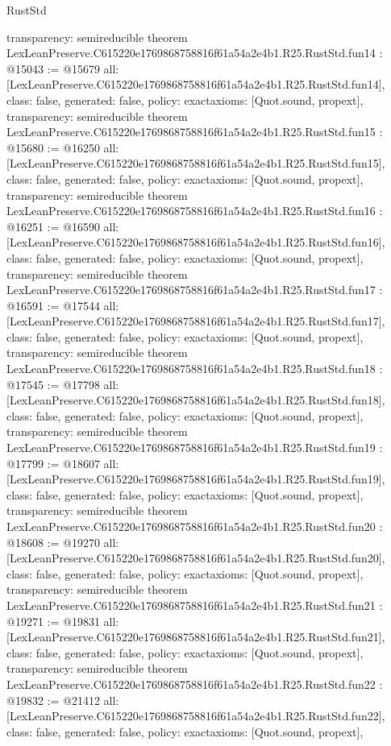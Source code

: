 \begin{lexlean}{RustStd}
\begin{coremodule}
{  transparency: semireducible
}
theorem LexLeanPreserve.C615220e1769868758816f61a54a2e4b1.R25.RustStd.fun14 : @15043 := @15679 {
  all: [LexLeanPreserve.C615220e1769868758816f61a54a2e4b1.R25.RustStd.fun14],
  class: false,
  generated: false,
  policy: exact{axioms: [Quot.sound, propext]},
  transparency: semireducible
}
theorem LexLeanPreserve.C615220e1769868758816f61a54a2e4b1.R25.RustStd.fun15 : @15680 := @16250 {
  all: [LexLeanPreserve.C615220e1769868758816f61a54a2e4b1.R25.RustStd.fun15],
  class: false,
  generated: false,
  policy: exact{axioms: [Quot.sound, propext]},
  transparency: semireducible
}
theorem LexLeanPreserve.C615220e1769868758816f61a54a2e4b1.R25.RustStd.fun16 : @16251 := @16590 {
  all: [LexLeanPreserve.C615220e1769868758816f61a54a2e4b1.R25.RustStd.fun16],
  class: false,
  generated: false,
  policy: exact{axioms: [Quot.sound, propext]},
  transparency: semireducible
}
theorem LexLeanPreserve.C615220e1769868758816f61a54a2e4b1.R25.RustStd.fun17 : @16591 := @17544 {
  all: [LexLeanPreserve.C615220e1769868758816f61a54a2e4b1.R25.RustStd.fun17],
  class: false,
  generated: false,
  policy: exact{axioms: [Quot.sound, propext]},
  transparency: semireducible
}
theorem LexLeanPreserve.C615220e1769868758816f61a54a2e4b1.R25.RustStd.fun18 : @17545 := @17798 {
  all: [LexLeanPreserve.C615220e1769868758816f61a54a2e4b1.R25.RustStd.fun18],
  class: false,
  generated: false,
  policy: exact{axioms: [Quot.sound, propext]},
  transparency: semireducible
}
theorem LexLeanPreserve.C615220e1769868758816f61a54a2e4b1.R25.RustStd.fun19 : @17799 := @18607 {
  all: [LexLeanPreserve.C615220e1769868758816f61a54a2e4b1.R25.RustStd.fun19],
  class: false,
  generated: false,
  policy: exact{axioms: [Quot.sound, propext]},
  transparency: semireducible
}
theorem LexLeanPreserve.C615220e1769868758816f61a54a2e4b1.R25.RustStd.fun20 : @18608 := @19270 {
  all: [LexLeanPreserve.C615220e1769868758816f61a54a2e4b1.R25.RustStd.fun20],
  class: false,
  generated: false,
  policy: exact{axioms: [Quot.sound, propext]},
  transparency: semireducible
}
theorem LexLeanPreserve.C615220e1769868758816f61a54a2e4b1.R25.RustStd.fun21 : @19271 := @19831 {
  all: [LexLeanPreserve.C615220e1769868758816f61a54a2e4b1.R25.RustStd.fun21],
  class: false,
  generated: false,
  policy: exact{axioms: [Quot.sound, propext]},
  transparency: semireducible
}
theorem LexLeanPreserve.C615220e1769868758816f61a54a2e4b1.R25.RustStd.fun22 : @19832 := @21412 {
  all: [LexLeanPreserve.C615220e1769868758816f61a54a2e4b1.R25.RustStd.fun22],
  class: false,
  generated: false,
  policy: exact{axioms: [Quot.sound, propext]},
}
\end{coremodule}
\end{lexlean}
